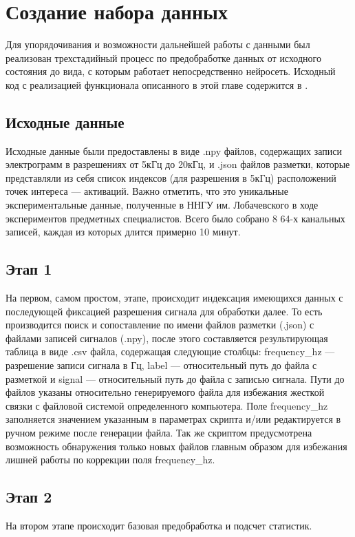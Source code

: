 \chapter{Создание набора данных}

Для упорядочивания и возможности дальнейшей работы с данными был реализован
трехстадийный процесс по предобработке данных от исходного состояния до вида, с
которым работает непосредственно нейросеть. Исходный код с реализацией
функционала описанного в этой главе содержится в \cite{egm-dataset-source}.


\section{Исходные данные}

Исходные данные были предоставлены в виде .npy файлов, содержащих записи
электрограмм в разрешениях от 5кГц до 20кГц, и .json файлов разметки, которые
представляли из себя список индексов (для разрешения в 5кГц) расположений точек
интереса --- активаций. Важно отметить, что это уникальные экспериментальные
данные, полученные в ННГУ им. Лобачевского в ходе экспериментов предметных
специалистов. Всего было собрано 8 64-х канальных записей, каждая из которых
длится примерно 10 минут.


\section{Этап 1} На первом, самом простом, этапе, происходит индексация
имеющихся данных с последующей фиксацией разрешения сигнала для обработки
далее. То есть производится поиск и сопоставление по имени файлов разметки
(.json) с файлами записей сигналов (.npy), после этого составляется
результирующая таблица в виде .csv файла, содержащая следующие столбцы:
frequency\_hz --- разрешение записи сигнала в Гц, label --- относительный путь
до файла с разметкой и signal --- относительный путь до файла с записью
сигнала. Пути до файлов указаны относительно генерируемого файла для избежания
жесткой связки с файловой системой определенного компьютера. Поле frequency\_hz
заполняется значением указанным в параметрах скрипта и/или редактируется в
ручном режиме после генерации файла. Так же скриптом предусмотрена возможность
обнаружения только новых файлов главным образом для избежания лишней работы по
коррекции поля frequency\_hz.

\section{Этап 2} На втором этапе происходит базовая предобработка и подсчет
статистик.

